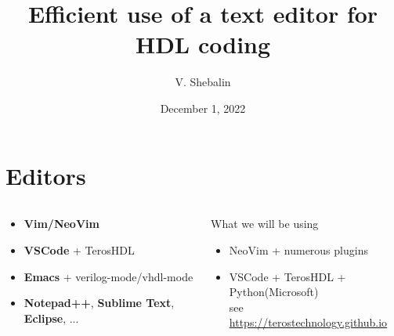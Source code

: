 \documentclass[aspectratio=169]{beamer}
\title[]{\bf Efficient use of a text editor for HDL coding}
\author{V. Shebalin}
\institute{\inst{}
{\textit {}}
}
\date[]{December 1,  2022}
\newcommand{\myurl}[1]{{\color{indigo}\url{#1}}}%
\begin{document}
\frame{\titlepage
}

\footnotesize

\section*{Editors}
\begin{frame}{\secname}

  \begin{columns}
    \begin{column}{0.5\textwidth}
  \begin{itemize}
    \item {\bf Vim/NeoVim}
    \item {\bf VSCode} + TerosHDL
    \item {\bf Emacs} + verilog-mode/vhdl-mode
    \item {\bf Notepad++}, {\bf Sublime Text}, {\bf Eclipse}, ...
  \end{itemize}
      
    \end{column}
    \begin{column}{0.5\textwidth}
  \begin{block}{What we will be using}
    \begin{itemize}
      \item NeoVim + numerous plugins
      \item VSCode + TerosHDL + Python(Microsoft) \\
        see \myurl{https://terostechnology.github.io}
    \end{itemize}
    
  \end{block}
      
    \end{column}
  \end{columns}

\end{frame}

\end{document}
